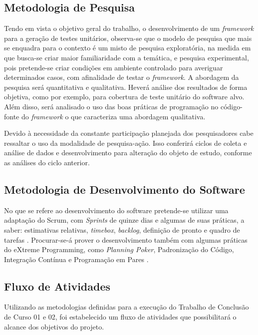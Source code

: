   \subsection{Metodologia de Pesquisa} \label{Metodologia de Pesquisa}
  Tendo em vista o objetivo geral do trabalho, o desenvolvimento de um \textit{framework} para a geração de testes unitários, observa-se que o modelo de pesquisa que mais se enquadra para o contexto é um misto de pesquisa exploratória, na medida em que busca-se criar maior familiaridade com a temática, e pesquisa experimental, pois pretende-se criar condições em ambiente controlado para averiguar determinados casos, com afinalidade de testar o \textit{framework}. A abordagem da pesquisa será quantitativa e qualitativa. Heverá análise dos resultados de forma objetiva, como por exemplo, para cobertura de teste unitário do software alvo. Além disso, será analisado o uso das boas práticas de programação no código-fonte do \textit{framework} o que caracteriza uma abordagem qualitativa.
  \par
  \indent Devido à necessidade da constante participação planejada dos pesquisadores cabe ressaltar o uso da modalidade de pesquisa-ação. Isso conferirá ciclos de coleta e análise de dados e desenvolvimento para alteração do objeto de estudo, conforme as análises do ciclo anterior.

 \subsection{Metodologia de Desenvolvimento do Software} \label{Metodologia de Desenvolvimento do Software}
  No que se refere ao desenvolvimento do software pretende-se utilizar uma adaptação do Scrum, com \textit{Sprints} de quinze dias e algumas de suas práticas, a saber: estimativas relativas, \textit{timebox}, \textit{backlog}, definição de pronto e quadro de tarefas \cite{scrum2009}. Procurar-se-á prover o desenvolvimento também com algumas práticas do eXtreme Programming, como \textit{Planning Poker}, Padronização do Código, Integração Contínua e Programação em Pares \cite{wells2009}.
 
 \subsection{Fluxo de Atividades}
 	
 	Utilizando as metodologias definidas para a execução do Trabalho de Conclusão de Curso 01 e 02, foi estabelecido um fluxo de atividades que possibilitará o alcance dos objetivos do projeto.
 	
